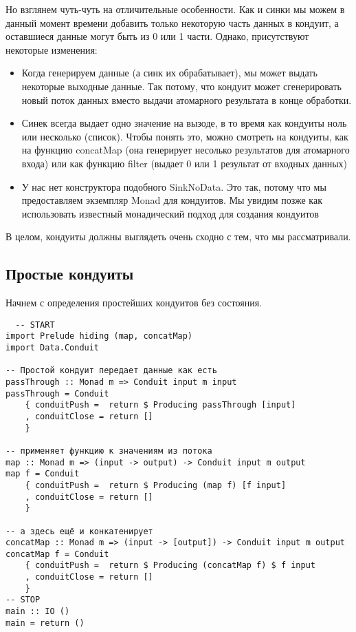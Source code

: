 Но взглянем чуть-чуть на отличительные особенности. Как и синки мы можем
в данный момент времени добавить только некоторую часть данных в кондуит, а оставшиеся данные могут быть из 0 или 1 части. Однако, присутствуют некоторые изменения:
\begin{itemize}  
\item Когда генерируем данные (а синк их обрабатывает), мы может выдать некоторые
выходные данные. Так потому, что кондуит может сгенерировать новый поток данных
вместо выдачи атомарного результата в конце обработки.
\item Синек всегда выдает одно значение на вызоде, в то время как кондуиты ноль или 
несколько (список). Чтобы понять это, можно смотреть на кондуиты, как на функцию
concatMap (она генерирует несолько результатов для атомарного входа)
или как функцию filter (выдает 0 или 1 результат от входных данных)
\item У нас нет конструктора подобного SinkNoData. Это так, потому что мы предоставляем
экземпляр Monad для кондуитов. Мы увидим позже как использовать известный 
монадический подход для создания кондуитов
\end{itemize}  
В целом, кондуиты должны выглядеть очень сходно с тем, что мы рассматривали.

\subsection{Простые кондуиты}

Начнем с определения простейших кондуитов без состояния.
\begin{lstlisting}
  -- START
import Prelude hiding (map, concatMap)
import Data.Conduit

-- Простой кондуит передает данные как есть
passThrough :: Monad m => Conduit input m input
passThrough = Conduit
    { conduitPush =  return $ Producing passThrough [input]
    , conduitClose = return []
    }

-- применяет функцию к значениям из потока
map :: Monad m => (input -> output) -> Conduit input m output
map f = Conduit
    { conduitPush =  return $ Producing (map f) [f input]
    , conduitClose = return []
    }

-- а здесь ещё и конкатенирует
concatMap :: Monad m => (input -> [output]) -> Conduit input m output
concatMap f = Conduit
    { conduitPush =  return $ Producing (concatMap f) $ f input
    , conduitClose = return []
    }
-- STOP
main :: IO ()
main = return ()
\end{lstlisting}


